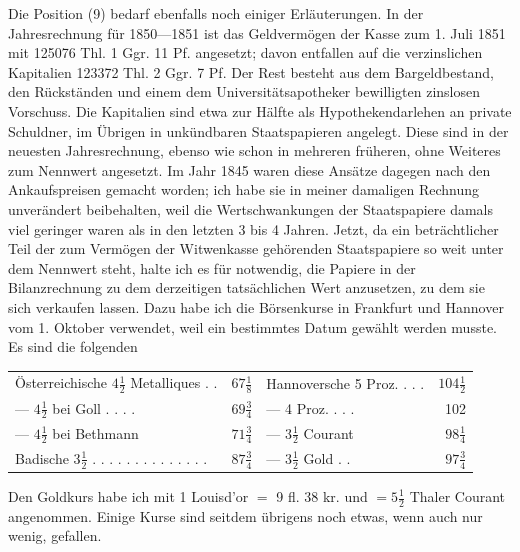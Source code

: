 Die Position (9) bedarf ebenfalls noch einiger Erläuterungen. In der Jahresrechnung für 1850—1851 ist das Geldvermögen der Kasse zum 1. Juli 1851 mit 125076 Thl. 1 Ggr. 11 Pf. angesetzt; davon entfallen auf die verzinslichen Kapitalien 123372 Thl. 2 Ggr. 7 Pf. Der Rest besteht aus dem Bargeldbestand, den Rückständen und einem dem Universitätsapotheker bewilligten zinslosen Vorschuss. Die Kapitalien sind etwa zur Hälfte als Hypothekendarlehen an private Schuldner, im Übrigen in unkündbaren Staatspapieren angelegt. Diese sind in der neuesten Jahresrechnung, ebenso wie schon in mehreren früheren, ohne Weiteres zum Nennwert angesetzt. Im Jahr 1845 waren diese Ansätze dagegen nach den Ankaufspreisen gemacht worden; ich habe sie in meiner damaligen Rechnung unverändert beibehalten, weil die Wertschwankungen der Staatspapiere damals viel geringer waren als in den letzten 3 bis 4 Jahren. Jetzt, da ein beträchtlicher Teil der zum Vermögen der Witwenkasse gehörenden Staatspapiere so weit unter dem Nennwert steht, halte ich es für notwendig, die Papiere in der Bilanzrechnung zu dem derzeitigen tatsächlichen Wert anzusetzen, zu dem sie sich verkaufen lassen. Dazu habe ich die Börsenkurse in Frankfurt und Hannover vom 1. Oktober verwendet, weil ein bestimmtes Datum gewählt werden musste. Es sind die folgenden
\begin{center}
\footnotesize\setlength{\tabcolsep}{2pt}
\begin{tabular}{l r|l r}
Österreichische \(4\tfrac{1}{2}\) Metalliques . .&\(67\tfrac{1}{8}\)&Hannoversche 5 Proz. . . .&\(104\tfrac{1}{2}\)\\
— \(4\tfrac{1}{2}\) bei Goll . . . .&\(69\tfrac{3}{4}\)&— 4 Proz. . . .&102\\
— \(4\tfrac{1}{2}\) bei Bethmann&\(71\tfrac{3}{4}\)&— \(3\tfrac{1}{2}\) Courant&\(98\tfrac{1}{4}\)\\
Badische \(3\tfrac{1}{2}\) . . . . . . . . . . . . . .&\(87\tfrac{3}{4}\)&— \(3\tfrac{1}{2}\) Gold . .&\(97\tfrac{3}{4}\)
\end{tabular}
\end{center}
\noindent\hspace*{\parindent}Den Goldkurs habe ich mit 1 Louisd’or \(=\) 9 fl. 38 kr. und \(=5\tfrac{1}{2}\) Thaler Courant angenommen. Einige Kurse sind seitdem übrigens noch etwas, wenn auch nur wenig, gefallen.

